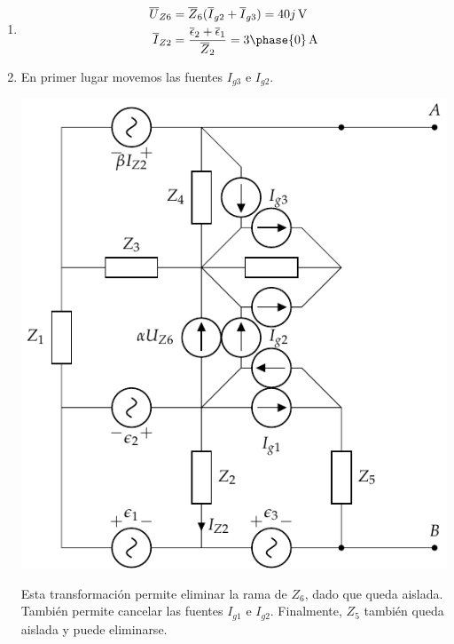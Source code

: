 \documentclass[12pt]{article}
\begin{document}
\begin{enumerate}
\item

  \begin{align*}
    \overline{U}_{Z6} &= \overline{Z}_6 (\overline{I}_{g2} + \overline{I}_{g3}) = \SI[parse-numbers=false]{40j}{\volt}\\
    \overline{I}_{Z2} &= \frac{\overline{\epsilon}_{2} + \overline{\epsilon}_{1}}{\overline{Z}_2} = \SI[parse-numbers=false]{3\phase{0}}{\ampere}\\
  \end{align*}


\item

  En primer lugar movemos las fuentes $I_{g3}$ e $I_{g2}$.

  \includegraphics[scale=0.8]{figs/thevenin_movilidad.pdf}

  Esta transformación permite eliminar la rama de $Z_6$, dado que
  queda aislada. También permite cancelar las fuentes $I_{g1}$ e
  $I_{g2}$. Finalmente, $Z_5$ también queda aislada y puede eliminarse.


\end{enumerate}
\end{document}
